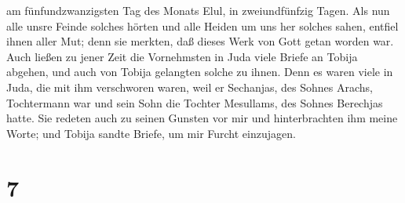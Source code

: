 am fünfundzwanzigsten Tag des Monats Elul, in zweiundfünfzig Tagen.
 Als nun alle unsre Feinde solches hörten und alle Heiden
um uns her solches sahen, entfiel ihnen aller Mut; denn sie merkten, daß
dieses Werk von Gott getan worden war.  Auch ließen zu
jener Zeit die Vornehmsten in Juda viele Briefe an Tobija abgehen, und
auch von Tobija gelangten solche zu ihnen.  Denn es waren
viele in Juda, die mit ihm verschworen waren, weil er Sechanjas, des
Sohnes Arachs, Tochtermann war und sein Sohn die Tochter Mesullams, des
Sohnes Berechjas hatte.  Sie redeten auch zu seinen
Gunsten vor mir und hinterbrachten ihm meine Worte; und Tobija sandte
Briefe, um mir Furcht einzujagen.

\hypertarget{section-6}{%
\section{7}\label{section-6}}

